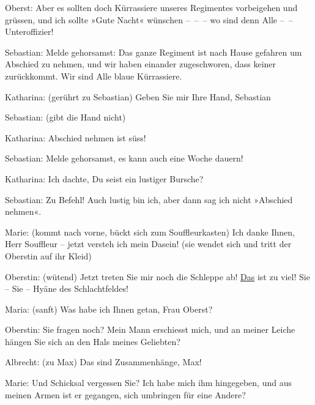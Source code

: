 \pstart
           Oberst: Aber es sollten doch Kürrassiere unseres Regimentes vorbeigehen und grüssen,
               und ich sollte »Gute Nacht« wünschen – – – wo sind denn Alle – – Unteroffizier!\pend
           
\pstart
           Sebastian: Melde gehorsamst: Das ganze Regiment ist nach Hause gefahren um Abschied
               zu nehmen, und wir haben einander {\pb}zugeschworen, dass keiner zurückkommt. Wir sind Alle blaue Kürrassiere.\pend
           
\pstart
           Katharina: (gerührt zu Sebastian) Geben Sie mir Ihre Hand, Sebastian\pend
           
\pstart
           Sebastian: (gibt die Hand nicht)\pend
           
\pstart
           Katharina: Abschied nehmen ist süss!\pend
           
\pstart
           Sebastian: Melde gehorsamst, es kann auch eine Woche dauern!\pend
           
\pstart
           Katharina: Ich dachte, Du seist ein lustiger Bursche?\pend
           
\pstart
           Sebastian: Zu Befehl! Auch lustig bin ich, aber dann sag ich nicht »Abschied
               nehmen«.\pend
           
\pstart
           Marie: (kommt nach vorne, bückt sich zum Souffleurkasten) Ich danke Ihnen, Herr
               Souffleur – jetzt versteh ich mein Dasein! (sie wendet sich und tritt der Oberstin
               auf ihr Kleid)\pend
           
\pstart
           Oberstin: (wütend) Jetzt treten Sie mir noch die Schleppe ab! \uline{Das} ist zu viel! Sie – Sie – Hyäne des Schlachtfeldes!\pend
           
\pstart
           Maria: (sanft) Was habe ich Ihnen getan, Frau Oberst?\pend
           
\pstart
           Oberstin: Sie fragen noch? Mein Mann erschiesst mich, und an meiner Leiche hängen Sie
               sich an den Hals meines Geliebten?\pend
           
\pstart
           Albrecht: (zu Max) Das sind  Zusammenhänge, Max!\pend
           
\pstart
           Marie: Und  Schicksal vergessen Sie? Ich habe mich ihm
               hingegeben, und aus meinen Armen ist er gegangen, sich umbringen für eine Andere?
                  \label{K_L01900-2v}\label{K_L01900-2h}\pend
           
